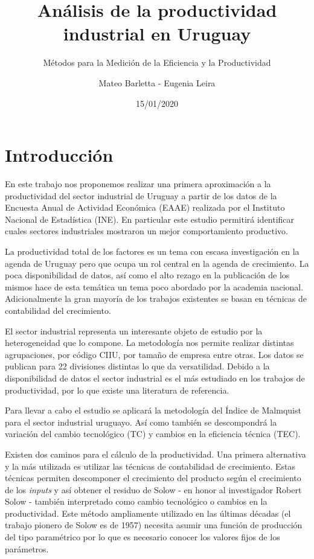 \documentclass[
]{article}
\title{Análisis de la productividad industrial en Uruguay}
\subtitle{Métodos para la Medición de la Eficiencia y la Productividad}
\author{Mateo Barletta - Eugenia Leira}
\date{15/01/2020}
\begin{document}
\maketitle

\renewcommand{\figurename}{Gráfico}
\renewcommand{\tablename}{Tabla}

\hypertarget{introducciuxf3n}{%
\section{Introducción}\label{introducciuxf3n}}

En este trabajo nos proponemos realizar una primera aproximación a la
productividad del sector industrial de Uruguay a partir de los datos de
la Encuesta Anual de Actividad Económica (EAAE) realizada por el
Instituto Nacional de Estadística (INE). En particular este estudio
permitirá identificar cuales sectores industriales mostraron un mejor
comportamiento productivo.

La productividad total de los factores es un tema con escasa
investigación en la agenda de Uruguay pero que ocupa un rol central en
la agenda de crecimiento. La poca disponibilidad de datos, así como el
alto rezago en la publicación de los mismos hace de esta temática un
tema poco abordado por la academia nacional. Adicionalmente la gran
mayoría de los trabajos existentes se basan en técnicas de contabilidad
del crecimiento.

El sector industrial representa un interesante objeto de estudio por la
heterogeneidad que lo compone. La metodología nos permite realizar
distintas agrupaciones, por código CIIU, por tamaño de empresa entre
otras. Los datos se publican para 22 divisiones distintas lo que da
versatilidad. Debido a la disponibilidad de datos el sector industrial
es el más estudiado en los trabajos de productividad, por lo que existe
una literatura de referencia.

Para llevar a cabo el estudio se aplicará la metodología del Índice de
Malmquist para el sector industrial uruguayo. Así como también se
descompondrá la variación del cambio tecnológico (TC) y cambios en la
eficiencia técnica (TEC).

Existen dos caminos para el cálculo de la productividad. Una primera
alternativa y la más utilizada es utilizar las técnicas de contabilidad
de crecimiento. Estas técnicas permiten descomponer el crecimiento del
producto según el crecimiento de los \emph{inputs} y así obtener el
residuo de Solow - en honor al investigador Robert Solow - también
interpretado como cambio tecnológico o cambios en la productividad. Este
método ampliamente utilizado en las últimas décadas (el trabajo pionero
de Solow es de 1957) necesita asumir una función de producción del tipo
paramétrico por lo que es necesario conocer los valores fijos de los
parámetros.
\end{document}
